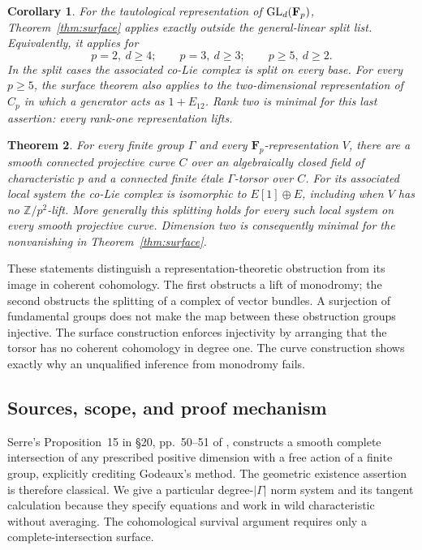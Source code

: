 \documentclass[11pt]{article}
\newcommand{\Fp}{\mathbf F_p}\newcommand{\OO}{\mathcal O}
\newtheorem{theorem}{Theorem}[section]
\newtheorem{corollary}[theorem]{Corollary}
\theoremstyle{definition}\newtheorem{definition}[theorem]{Definition}
\theoremstyle{remark}\newtheorem{remark}[theorem]{Remark}
\begin{document}
\begin{corollary}\label{cor:linear}
For the tautological representation of $\GL_d(\Fp)$, Theorem~\ref{thm:surface} applies exactly outside the general-linear split list. Equivalently, it applies for
\[
 p=2,\ d\geq4;\qquad p=3,\ d\geq3;\qquad
 p\geq5,\ d\geq2.
\]
In the split cases the associated co-Lie complex is split on every base. For every $p\geq5$, the surface theorem also applies to the two-dimensional representation of $C_p$ in which a generator acts as $1+E_{12}$. Rank two is minimal for this last assertion: every rank-one representation lifts.
\end{corollary}

\begin{theorem}\label{thm:curve}
For every finite group $\Gamma$ and every $\Fp$-representation $V$, there are a smooth connected projective curve $C$ over an algebraically closed field of characteristic $p$ and a connected finite \'etale $\Gamma$-torsor over $C$. For its associated local system the co-Lie complex is isomorphic to $E[1]\oplus E$, including when $V$ has no $\mathbb Z/p^2$-lift. More generally this splitting holds for every such local system on every smooth projective curve. Dimension two is consequently minimal for the nonvanishing in Theorem~\ref{thm:surface}.
\end{theorem}

These statements distinguish a representation-theoretic obstruction from its image in coherent cohomology. The first obstructs a lift of monodromy; the second obstructs the splitting of a complex of vector bundles. A surjection of fundamental groups does not make the map between these obstruction groups injective. The surface construction enforces injectivity by arranging that the torsor has no coherent cohomology in degree one. The curve construction shows exactly why an unqualified inference from monodromy fails.

\subsection*{Sources, scope, and proof mechanism}

Serre's Proposition~15 in \S20, pp.~50--51 of \citet{Serre}, constructs a smooth complete intersection of any prescribed positive dimension with a free action of a finite group, explicitly crediting Godeaux's method. The geometric existence assertion is therefore classical. We give a particular degree-$|\Gamma|$ norm system and its tangent calculation because they specify equations and work in wild characteristic without averaging. The cohomological survival argument requires only a complete-intersection surface.
\end{document}
